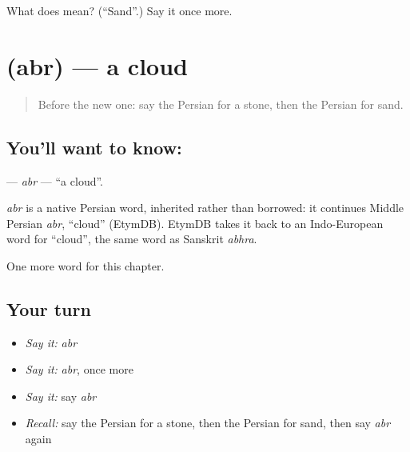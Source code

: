 \begin{tcolorbox}[breakable,colback=teal!4,colframe=teal!35!black,title={Before you move on}]
What does  mean? (\textquotedblleft{}Sand\textquotedblright{}.) Say it once more.
\end{tcolorbox}
\section[\texorpdfstring{\fa{ابر} (abr)}{ابر (abr)}]{ (abr) — a cloud}

\label{lesson:FA-C53-abr}



\begin{quote}
Before the new one: say the Persian for a stone, then the Persian for sand.
\end{quote}

\subsection*{You'll want to know: }
\textbf{} — \emph{abr} — \textquotedblleft{}a cloud\textquotedblright{}.

\begin{cousinweb}
\emph{abr} is a native Persian word, inherited rather than borrowed: it continues Middle Persian \emph{abr}, \textquotedblleft{}cloud\textquotedblright{} (EtymDB). EtymDB takes it back to an Indo-European word for \textquotedblleft{}cloud\textquotedblright{}, the same word as Sanskrit \emph{abhra}.
\end{cousinweb}

\begin{grammarlens}[title={What you've built}]
One more word for this chapter.
\end{grammarlens}

\subsection*{Your turn}
\begin{itemize}
\raggedright
  \item \emph{Say it:} \emph{abr}
  \item \emph{Say it:} \emph{abr}, once more
  \item \emph{Say it:} say \emph{abr}
  \item \emph{Recall:} say the Persian for a stone, then the Persian for sand, then say \emph{abr} again
\end{itemize}

